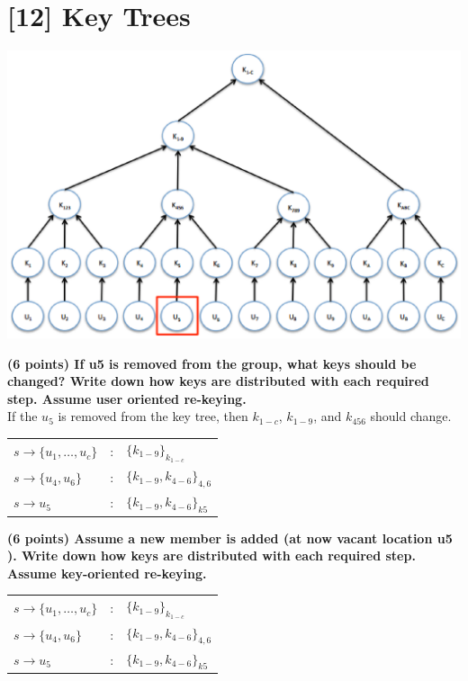 \documentclass[letterpaper,11pt,notitlepage,fleqn]{article}
\begin{document}
\section{[12] Key Trees}
\begin{center}
    \includegraphics[scale=0.5]{three.eps}
\end{center}

\noindent\textbf{(6 points) If u5 is removed from the group, what keys should be changed? Write down how keys are distributed with each required step. Assume user oriented re-keying.} \\
If the $u_{5}$ is removed from the key tree, then $k_{1-c}$, $k_{1-9}$, and $k_{456}$ should change. \\

\begin{tabular}{l c l}
    $s \rightarrow \{u_{1},\dots,u_{c}\}$ & : & $\{k_{1-9}\}_{k_{1-c}}$ \\
    $s \rightarrow \{u_{4},u_{6}\}$ & : & $\{k_{1-9}, k_{4-6}\}_{4,6}$ \\
    $s \rightarrow u_{5}$ & : & $\{k_{1-9},k_{4-6}\}_{k5}$ \\
\end{tabular}


\noindent\textbf{(6 points) Assume a new member is added (at now vacant location u5 ). Write down how keys are distributed with each required step. Assume key-oriented re-keying.} \\

\begin{tabular}{l c l}
    $s \rightarrow \{u_{1},\dots,u_{c}\}$ & : & $\{k_{1-9}\}_{k_{1-c}}$ \\
    $s \rightarrow \{u_{4},u_{6}\}$ & : & $\{k_{1-9}, k_{4-6}\}_{4,6}$ \\
    $s \rightarrow u_{5}$ & : & $\{k_{1-9},k_{4-6}\}_{k5}$ \\
\end{tabular}
\end{document}
